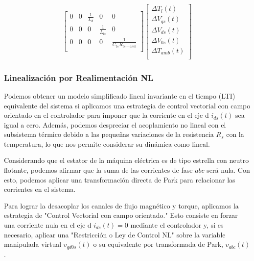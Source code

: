 \documentclass{article}
\begin{document}
\begin{itemize}
\begin{equation*}
\begin{gathered}
\begin{bmatrix}
        0 & 0 & \frac{1}{L_{d}} & 0 & 0\\
        0 & 0 & 0 & \frac{1}{L_{ls}} & 0\\
        0 & 0 & 0 & 0 & \frac{1}{C_{ts}R_{ts-amb}}\\
    \end{bmatrix}
    \begin{bmatrix}
        \Delta{T}_{l}(t)\\
        \Delta{V}_{qs}(t)\\
        \Delta{V}_{ds}(t)\\
        \Delta{V}_{0s}(t)\\
        \Delta T_{amb}(t)\\
    \end{bmatrix} 
\end{gathered}
\end{equation*}

\end{itemize}


\subsubsection{Linealización por Realimentación NL}

Podemos obtener un modelo simplificado lineal invariante en el tiempo (LTI) equivalente del sistema
si aplicamos una estrategia de control vectorial con campo orientado en el controlador para imponer
que la corriente en el eje d $i_{ds}(t)$ sea igual a cero. Además, podemos despreciar 
el acoplamiento no lineal con el subsistema térmico debido a las pequeñas variaciones de la 
resistencia \(R_s\) con la temperatura, lo que nos permite considerar su dinámica como lineal.

Considerando que el estator de la máquina eléctrica es de tipo estrella con neutro flotante, 
podemos afirmar que la suma de las corrientes de fase \(abc\) será nula. Con esto, podemos aplicar 
una transformación directa de Park para relacionar las corrientes en el sistema.

Para lograr la desacoplar los canales de flujo magnético y torque, aplicamos la estrategia de 
"Control Vectorial con campo orientado." Esto consiste en forzar una corriente nula en el eje 
d \(i_{ds}(t) = 0\) mediante el controlador y, si es necesario, aplicar una "Restricción o Ley 
de Control NL" sobre la variable manipulada virtual \(v_{qd0s}(t)\) o su equivalente por 
transformada de Park, \(v_{{abc}}(t)\).
\end{document}
